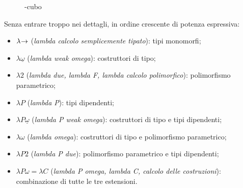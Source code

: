 \begin{figure}
    \vspace{4mm}
    \caption{\textlambda-cubo}
    \label{fig:3-2-lambda-cube}
    \vspace{4mm}
\end{figure}

\noindent Senza entrare troppo nei dettagli, in ordine crescente di potenza espressiva:

\begin{itemize}
    \item $\lambda\mkern-4mu\rightarrow$ (\textit{lambda calcolo semplicemente tipato}): tipi monomorfi;
    \item $\lambda\underline{\omega}$ (\textit{lambda weak omega}): costruttori di tipo;
    \item $\lambda2$ (\textit{lambda due, lambda F, lambda calcolo polimorfico}): polimorfismo parametrico;
    \item $\lambda P$ (\textit{lambda P}): tipi dipendenti;
    \item $\lambda P\underline{\omega}$ (\textit{lambda P weak omega}): costruttori di tipo e tipi dipendenti;
    \item $\lambda\omega$ (\textit{lambda omega}): costruttori di tipo e polimorfismo parametrico;
    \item $\lambda P2$ (\textit{lambda P due}): polimorfismo parametrico e tipi dipendenti;
    \item $\lambda P\omega\!=\!\lambda C$ (\textit{lambda P omega, lambda C, calcolo delle costruzioni}): combinazione di tutte le tre estensioni.
\end{itemize}